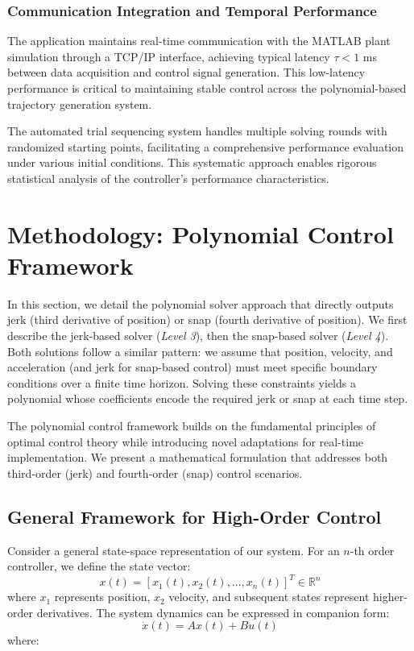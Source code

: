 \documentclass[12pt]{article}
\begin{document}
\subsubsection{Communication Integration and Temporal Performance}
The application maintains real-time communication with the MATLAB plant simulation through a TCP/IP interface, achieving typical latency $\tau < 1$ ms between data acquisition and control signal generation. This low-latency performance is critical to maintaining stable control across the polynomial-based trajectory generation system.

The automated trial sequencing system handles multiple solving rounds with randomized starting points, facilitating a comprehensive performance evaluation under various initial conditions. This systematic approach enables rigorous statistical analysis of the controller's performance characteristics.

\section{Methodology: Polynomial Control Framework}
\label{sec:methodology}
In this section, we detail the polynomial solver approach that directly outputs jerk (third derivative of position) or snap (fourth derivative of position). We first describe the jerk-based solver (\emph{Level 3}), then the snap-based solver (\emph{Level 4}). Both solutions follow a similar pattern: we assume that position, velocity, and acceleration (and jerk for snap-based control) must meet specific boundary conditions over a finite time horizon. Solving these constraints yields a polynomial whose coefficients encode the required jerk or snap at each time step.

The polynomial control framework builds on the fundamental principles of optimal control theory while introducing novel adaptations for real-time implementation. We present a mathematical formulation that addresses both third-order (jerk) and fourth-order (snap) control scenarios.

\subsection{General Framework for High-Order Control}
Consider a general state-space representation of our system. For an $n$-th order controller, we define the state vector:
\begin{equation}
    x(t) = [x_1(t), x_2(t), ..., x_n(t)]^T \in \mathbb{R}^n
\end{equation}
where $x_1$ represents position, $x_2$ velocity, and subsequent states represent higher-order derivatives. The system dynamics can be expressed in companion form:
\begin{equation}
    \dot{x}(t) = Ax(t) + Bu(t)
\end{equation}
where:
\end{document}
